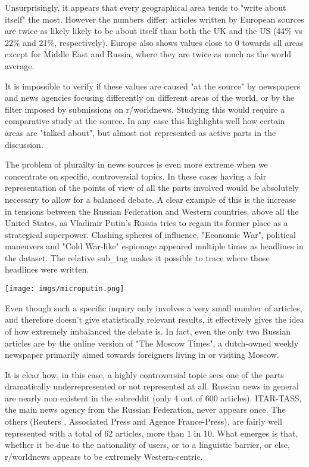 \documentclass{article}
\begin{document}
\bigskip


\bigskip

Unsurprisingly, it appears that every geographical area tends to "write about itself" the most. However the numbers differ: articles written by European sources are twice as likely likely to be about itself than both the UK and the US (44\% vs 22\% and 21\%, respectively). Europe also shows values close to 0 towards all areas except for Middle East and Russia, where they are twice as much as the world average.

It is impossible to verify if these values are caused "at the source" by newspapers and news agencies focusing differently on different areas of the world, or by the filter imposed by submissions on r/worldnews. Studying this would require a comparative study at the source. In any case this highlights well how certain areas are "talked about", but almost not represented as active parts in the discussion.

The problem of plurailty in news sources is even more extreme when we concentrate on specific, controversial topics. In these cases having a fair representation of the points of view of all the parts involved would be absolutely necessary to allow for a balanced debate. A clear example of this is the increase in tensions between the Russian Federation and Western countries, above all the United States, as Vladimir Putin's Russia tries to regain its former place as a strategical superpower. Clashing spheres of influence, "Economic War", political maneuvers and "Cold War-like" espionage appeared multiple times as headlines in the dataset. The relative sub\_tag makes it possible to trace where those headlines were written.

\bigskip

\texttt{[image: imgs/microputin.png]}

\bigskip

Even though such a specific inquiry only involves a very small number of articles, and therefore doesn't give statistically relevant results, it effectively gives the idea of how extremely imbalanced the debate is. In fact, even the only two Russian articles are by the online version of "The Moscow Times", a dutch-owned weekly newspaper primarily aimed towards foreigners living in or visiting Moscow.

It is clear how, in this case, a highly controversial topic sees one of the parts dramatically underrepresented or not represented at all. Russian news in general are nearly non existent in the subreddit (only 4 out of 600 articles). ITAR-TASS, the main news agency from the Russian Federation, never appears once. The others (Reuters , Associated Press and Agence France-Press), are fairly well represented with a total of 62 articles, more than 1 in 10. What emerges is that, whether it be due to the nationality of users, or to a linguistic barrier, or else, r/worldnews appears to be extremely Western-centric. 
\end{document}
